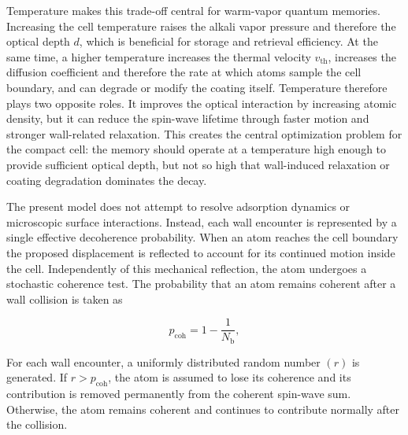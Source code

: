 Temperature makes this trade-off central for warm-vapor quantum memories. Increasing the cell temperature raises the alkali vapor pressure and therefore the optical depth \(d\), which is beneficial for storage and retrieval efficiency. At the same time, a higher temperature increases the thermal velocity \(v_{\mathrm{th}}\), increases the diffusion coefficient and therefore the rate at which atoms sample the cell boundary, and can degrade or modify the coating itself. Temperature therefore plays two opposite roles. It improves the optical interaction by increasing atomic density, but it can reduce the spin-wave lifetime through faster motion and stronger wall-related relaxation. This creates the central optimization problem for the compact cell: the memory should operate at a temperature high enough to provide sufficient optical depth, but not so high that wall-induced relaxation or coating degradation dominates the decay.

The present model does not attempt to resolve adsorption dynamics or microscopic surface interactions. Instead, each wall encounter is represented by a single effective decoherence probability. When an atom reaches the cell boundary the proposed displacement is reflected to account for its continued motion inside the cell. Independently of this mechanical reflection, the atom undergoes a stochastic coherence test. The probability that an atom remains coherent after a wall collision is taken as

\begin{equation}
    p_{\mathrm{coh}}
    =
    1-\frac{1}{N_{\mathrm b}},
    \label{eq:coherence_probability}
\end{equation}

For each wall encounter, a uniformly distributed random number $(r)$ is generated. If $r>p_{\mathrm{coh}}$, the atom is assumed to lose its coherence and its contribution is removed permanently from the coherent spin-wave sum. Otherwise, the atom remains coherent and continues to contribute normally after the collision.


